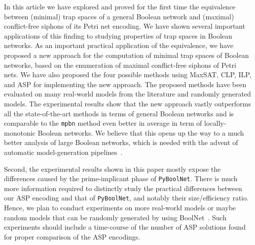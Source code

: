 \documentclass[preprint,12pt]{elsarticle}
\begin{document}
In this article we have explored and proved for the first time the equivalence between (minimal) trap spaces of a general Boolean network and (maximal) conflict-free siphons of its Petri net encoding.
We have shown several important applications of this finding to studying properties of trap spaces in Boolean networks. 
As an important practical application of the equivalence, we have proposed a new approach for the computation of minimal trap spaces of Boolean networks, based on the enumeration of maximal conflict-free siphons of Petri nets.
We have also proposed the four possible methods using MaxSAT, CLP, ILP, and ASP for implementing the new approach.
The proposed methods have been evaluated on many real-world models from the literature and randomly generated models.
The experimental results show that the new approach vastly outperforms all the state-of-the-art methods in terms of general Boolean networks and is comparable to the \texttt{mpbn} method even better in average in term of locally-monotonic Boolean networks.
We believe that this opens up the way to a much better analysis of large Boolean networks, which is needed with the advent of automatic model-generation pipelines~\cite{ostaszewski2021covid19}.


Second, the experimental results shown in this paper mostly expose the differences caused by the prime-implicant phase of \texttt{PyBoolNet}. There is much more information required to distinctly study the practical differences between our ASP encoding and that of \texttt{PyBoolNet}, and notably their size/efficiency ratio.
Hence, we plan to conduct experiments on more real-world models or maybe random models that can be randomly generated by using BoolNet~\cite{mussel2010boolnet}.
Such experiments should include a time-course of the number of ASP solutions found for proper comparison of the ASP encodings.
\end{document}
